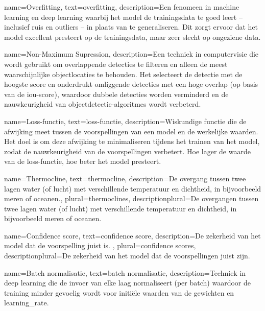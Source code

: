 {
    name={Overfitting},
    text={overfitting},
    description={Een fenomeen in machine learning en deep learning waarbij het model de trainingsdata te goed leert -- inclusief ruis en outliers -- in plaats van te generaliseren. Dit zorgt ervoor dat het model excellent presteert op de trainingsdata, maar zeer slecht op ongeziene data.}
}

{
    name={Non-Maximum Supression},
    description={Een techniek in computervisie die wordt gebruikt om overlappende detecties te filteren en alleen de meest waarschijnlijke objectlocaties te behouden. Het selecteert de detectie met de hoogste score en onderdrukt omliggende detecties met een hoge overlap (op basis van de \gls{iou}-score), waardoor dubbele detecties worden verminderd en de nauwkeurigheid van objectdetectie-algoritmes wordt verbeterd. \autocite{Geron_2023}}
}

{
    name={Loss-functie},
    text={loss-functie},
    description={Wiskundige functie die de afwijking meet tussen de voorspellingen van een model en de werkelijke waarden. Het doel is om deze afwijking te minimaliseren tijdens het trainen van het model, zodat de nauwkeurigheid van de voorspellingen verbetert. Hoe lager de waarde van de loss-functie, hoe beter het model presteert. \autocite{Geron_2023}}
}

{
    name={Thermocline},
    text={thermocline},
    description={De overgang tussen twee lagen water (of lucht) met verschillende temperatuur en dichtheid, in bijvoorbeeld meren of oceanen.},
    plural={thermoclines},
    descriptionplural={De overgangen tussen twee lagen water (of lucht) met verschillende temperatuur en dichtheid, in bijvoorbeeld meren of oceanen.}
}

{
    name={Confidence score},
    text={confidence score},
    description={De zekerheid van het model dat de voorspelling juist is. \autocite{Geron_2023}},
    plural={confidence scores},
    descriptionplural={De zekerheid van het model dat de voorspellingen juist zijn. \autocite{Geron_2023}}    
}

{
    name={Batch normalisatie},
    text={batch normalisatie},
    description={Techniek in deep learning die de invoer van elke laag normaliseert (per batch) waardoor de training minder gevoelig wordt voor initiële waarden van de gewichten en \gls{learning_rate}. \autocite{Geron_2023}}
}

